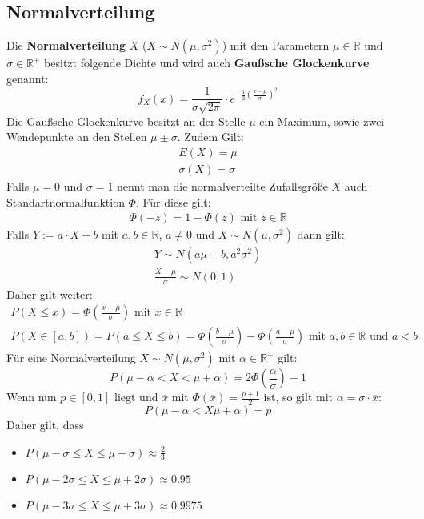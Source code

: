 \documentclass[12pt]{article}
\begin{document}
\subsection{Normalverteilung}
Die \textbf{Normalverteilung} $X$ ($X\sim N(\mu , \sigma^2)$) mit den Parametern $\mu\in\mathbb{R}$ und $\sigma\in\mathbb{R}^+$ besitzt folgende Dichte und wird auch \textbf{Gaußsche Glockenkurve} genannt:
\begin{equation*}
	f_X(x)=\frac{1}{\sigma\sqrt{2\pi}}\cdot e^{-\frac{1}{2}(\frac{x-\mu}{\sigma})^2}
\end{equation*}
Die Gaußsche Glockenkurve besitzt an der Stelle $\mu$ ein Maximum, sowie zwei Wendepunkte an den Stellen $\mu\pm\sigma$. Zudem Gilt:
\begin{gather*}
	E(X)=\mu \\
	\sigma(X)=\sigma
\end{gather*}
Falls $\mu = 0$ und $\sigma = 1$ nennt man die normalverteilte Zufallsgröße $X$ auch Standartnormalfunktion $\Phi$. Für diese gilt:
\begin{gather*}
	\Phi(-z) = 1-\Phi(z) \text{ mit } z\in\mathbb{R}
\end{gather*} 
Falls $Y:=a\cdot X+b$ mit $a,b\in\mathbb{R}$, $a\neq 0$ und $X\sim N(\mu,\sigma^2)$ dann gilt:
\begin{gather*}
	Y\sim N(a\mu+b,a^2\sigma^2)\\
	\frac{X-\mu}{\sigma}\sim N(0,1)
\end{gather*}
Daher gilt weiter:
\begin{gather*}
	P(X\leq x)=\Phi\left(\frac{x-\mu}{\sigma}\right) \text{ mit } x\in\mathbb{R}\\
	P(X\in[a,b])=P(a\leq X\leq b)=\Phi\left(\frac{b-\mu}{\sigma}\right)-\Phi\left(\frac{a-\mu}{\sigma}\right) \text{ mit } a,b\in\mathbb{R} \text{ und } a<b
\end{gather*}
Für eine Normalverteilung $X\sim N(\mu,\sigma^2)$ mit $\alpha\in\mathbb{R}^+$ gilt:
\begin{equation*}
	P(\mu-\alpha<X<\mu+\alpha)=2\Phi\left(\frac{\alpha}{\sigma}\right)-1
\end{equation*}
Wenn nun $p\in[0,1]$ liegt und $\overline{x}$ mit $\Phi(\overline{x})=\frac{p+1}{2}$ ist, so gilt mit $\alpha=\sigma\cdot\overline{x}$:
\begin{equation*}
	P(\mu-\alpha<X\mu+\alpha)=p
\end{equation*}
Daher gilt, dass
\begin{itemize}
	\item $P(\mu-\sigma\leq X\leq\mu+\sigma)\approx\frac{2}{3}$
	\item $P(\mu-2\sigma\leq X\leq\mu+2\sigma)\approx 0.95$
	\item $P(\mu-3\sigma\leq X\leq\mu+3\sigma)\approx 0.9975$
\end{itemize}
\end{document}
